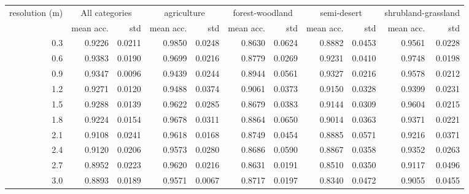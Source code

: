 \begin{tabular}{rrrrrrrrrrr}
\toprule
resolution (m) & \multicolumn{2}{c}{All categories} & \multicolumn{2}{c}{agriculture} & \multicolumn{2}{c}{forest-woodland} & \multicolumn{2}{c}{semi-desert} & \multicolumn{2}{c}{shrubland-grassland} \\
           &     mean acc. &    std &                 mean acc. &    std &                     mean acc. &    std &                 mean acc. &    std &                         mean acc. &    std \\
\midrule
       0.3 &   0.9226 & 0.0211 &               0.9850 & 0.0248 &                   0.8630 & 0.0624 &               0.8882 & 0.0453 &                       0.9561 & 0.0228 \\
       0.6 &   0.9383 & 0.0190 &               0.9699 & 0.0216 &                   0.8779 & 0.0269 &               0.9231 & 0.0410 &                       0.9748 & 0.0198 \\
       0.9 &   0.9347 & 0.0096 &               0.9439 & 0.0244 &                   0.8944 & 0.0561 &               0.9327 & 0.0216 &                       0.9578 & 0.0212 \\
       1.2 &   0.9271 & 0.0120 &               0.9488 & 0.0374 &                   0.9061 & 0.0373 &               0.9150 & 0.0328 &                       0.9399 & 0.0231 \\
       1.5 &   0.9288 & 0.0139 &               0.9622 & 0.0285 &                   0.8679 & 0.0383 &               0.9144 & 0.0309 &                       0.9604 & 0.0215 \\
       1.8 &   0.9224 & 0.0154 &               0.9678 & 0.0311 &                   0.8864 & 0.0650 &               0.9014 & 0.0363 &                       0.9371 & 0.0221 \\
       2.1 &   0.9108 & 0.0241 &               0.9618 & 0.0168 &                   0.8749 & 0.0454 &               0.8885 & 0.0571 &                       0.9216 & 0.0371 \\
       2.4 &   0.9120 & 0.0206 &               0.9573 & 0.0280 &                   0.8686 & 0.0590 &               0.8867 & 0.0358 &                       0.9352 & 0.0263 \\
       2.7 &   0.8952 & 0.0223 &               0.9620 & 0.0216 &                   0.8631 & 0.0191 &               0.8510 & 0.0350 &                       0.9117 & 0.0496 \\
       3.0 &   0.8893 & 0.0189 &               0.9571 & 0.0067 &                   0.8717 & 0.0197 &               0.8340 & 0.0472 &                       0.9055 & 0.0455 \\

\end{tabular}
